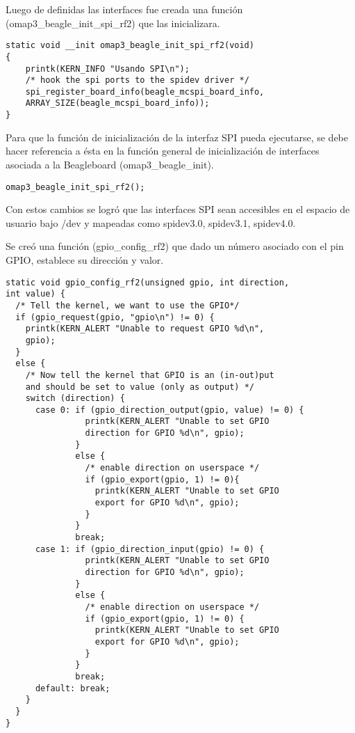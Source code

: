 Luego de definidas las interfaces fue creada una función (omap3\_beagle\_init\_spi\_rf2) que las inicializara.

\begin{verbatim}
static void __init omap3_beagle_init_spi_rf2(void) 
{ 
    printk(KERN_INFO "Usando SPI\n");  
    /* hook the spi ports to the spidev driver */ 
    spi_register_board_info(beagle_mcspi_board_info, 
    ARRAY_SIZE(beagle_mcspi_board_info)); 
}
\end{verbatim}

Para que la función de inicialización de la interfaz SPI pueda ejecutarse, se debe hacer referencia a ésta en la función general de inicialización de interfaces asociada a la Beagleboard (omap3\_beagle\_init).

\begin{verbatim}
omap3_beagle_init_spi_rf2();
\end{verbatim}

Con estos cambios se logró que las interfaces SPI sean accesibles en el espacio de usuario bajo /dev y mapeadas como spidev3.0, spidev3.1, spidev4.0.

\newpage
{}

\bigskip
Se creó una función (gpio\_config\_rf2) que dado un número asociado con el pin GPIO, establece su dirección y valor.

\begin{verbatim}
static void gpio_config_rf2(unsigned gpio, int direction, 
int value) {
  /* Tell the kernel, we want to use the GPIO*/
  if (gpio_request(gpio, "gpio\n") != 0) {
    printk(KERN_ALERT "Unable to request GPIO %d\n", 
    gpio);
  }
  else {
    /* Now tell the kernel that GPIO is an (in-out)put 
    and should be set to value (only as output) */
    switch (direction) {
      case 0: if (gpio_direction_output(gpio, value) != 0) {
                printk(KERN_ALERT "Unable to set GPIO 
                direction for GPIO %d\n", gpio);
              }
              else {
                /* enable direction on userspace */
                if (gpio_export(gpio, 1) != 0){ 
                  printk(KERN_ALERT "Unable to set GPIO 
                  export for GPIO %d\n", gpio);
                }
              }
              break;
      case 1: if (gpio_direction_input(gpio) != 0) {
                printk(KERN_ALERT "Unable to set GPIO 
                direction for GPIO %d\n", gpio);
              }
              else {
                /* enable direction on userspace */
                if (gpio_export(gpio, 1) != 0) { 
                  printk(KERN_ALERT "Unable to set GPIO 
                  export for GPIO %d\n", gpio);
                }
              }
              break;
      default: break;
    }
  }	
}
\end{verbatim}

